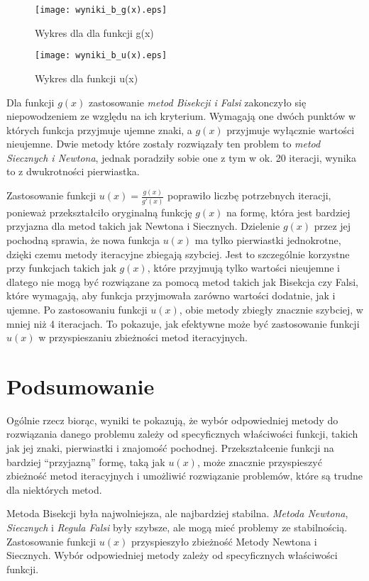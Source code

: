 \documentclass{article}
\begin{document}
  \begin{figure}[!ht]
    \begin{minipage}{0.5\textwidth}
      \centering
      \texttt{[image: wyniki\_b\_g(x).eps]}
      \caption{Wykres dla dla funkcji g(x)}
    \end{minipage}
    \begin{minipage}{0.5\textwidth}
      \centering
      \texttt{[image: wyniki\_b\_u(x).eps]}
      \caption{Wykres dla funkcji u(x)}
    \end{minipage}
  \end{figure}

  \newpage

  Dla funkcji $g(x)$ zastosowanie \textit{metod Bisekcji i Falsi} zakonczyło się niepowodzeniem ze względu na ich kryterium. Wymagają one dwóch punktów w których funkcja przyjmuje ujemne znaki, a $g(x)$ przyjmuje wyłącznie wartości nieujemne.
  Dwie metody które zostały rozwiązały ten problem to \textit{metod Siecznych i Newtona}, jednak poradziły sobie one z tym w ok. 20 iteracji, wynika to z dwukrotności pierwiastka.

  Zastosowanie funkcji $u(x) = \frac{g(x)}{g'(x)}$ poprawiło liczbę potrzebnych iteracji, ponieważ przekształciło oryginalną funkcję $g(x)$ na formę, która jest bardziej przyjazna dla metod takich jak Newtona i Siecznych. Dzielenie $g(x)$ przez jej pochodną sprawia, że nowa funkcja $u(x)$ ma tylko pierwiastki jednokrotne, dzięki czemu metody iteracyjne zbiegają szybciej. Jest to szczególnie korzystne przy funkcjach takich jak $g(x)$, które przyjmują tylko wartości nieujemne i dlatego nie mogą być rozwiązane za pomocą metod takich jak Bisekcja czy Falsi, które wymagają, aby funkcja przyjmowała zarówno wartości dodatnie, jak i ujemne.
  Po zastosowaniu funkcji $u(x)$, obie metody zbiegły znacznie szybciej, w mniej niż 4 iteracjach. To pokazuje, jak efektywne może być zastosowanie funkcji $u(x)$ w przyspieszaniu zbieżności metod iteracyjnych.

  \section{Podsumowanie}
  Ogólnie rzecz biorąc, wyniki te pokazują, że wybór odpowiedniej metody do rozwiązania danego problemu zależy od specyficznych właściwości funkcji, takich jak jej znaki, pierwiastki i znajomość pochodnej. Przekształcenie funkcji na bardziej “przyjazną” formę, taką jak $u(x)$, może znacznie przyspieszyć zbieżność metod iteracyjnych i umożliwić rozwiązanie problemów, które są trudne dla niektórych metod.

  Metoda Bisekcji była najwolniejsza, ale najbardziej stabilna. \textit{Metoda Newtona}, \textit{Siecznych} i \textit{Regula Falsi} były szybsze, ale mogą mieć problemy ze stabilnością. Zastosowanie funkcji $u(x)$ przyspieszyło zbieżność Metody Newtona i Siecznych. Wybór odpowiedniej metody zależy od specyficznych właściwości funkcji.
\end{document}
